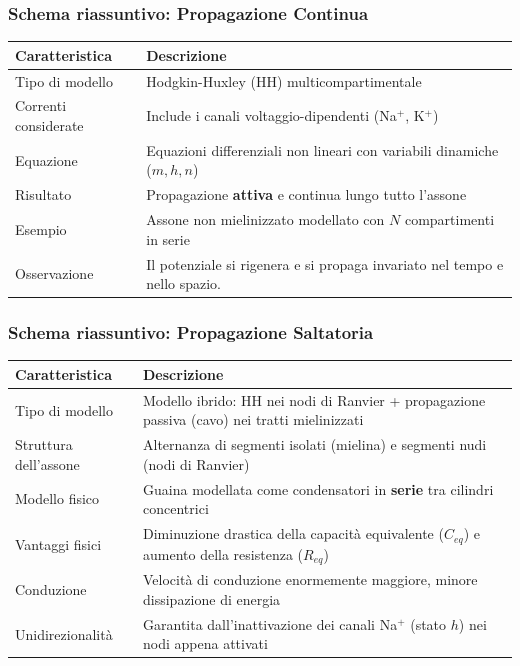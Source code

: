 \documentclass[12pt,a4paper,openany]{book}
\begin{document}
\subsubsection{Schema riassuntivo: Propagazione Continua}
\begin{table}[H]
\centering
\renewcommand{\arraystretch}{1.5}
\begin{tabularx}{\textwidth}{l X}
\toprule
\textbf{Caratteristica} & \textbf{Descrizione} \\
\midrule
Tipo di modello & Hodgkin-Huxley (HH) multicompartimentale \\
Correnti considerate & Include i canali voltaggio-dipendenti (Na$^+$, K$^+$) \\
Equazione & Equazioni differenziali non lineari con variabili dinamiche ($m, h, n$) \\
Risultato & Propagazione \textbf{attiva} e continua lungo tutto l’assone \\
Esempio & Assone non mielinizzato modellato con $N$ compartimenti in serie \\
Osservazione & Il potenziale si rigenera e si propaga invariato nel tempo e nello spazio. \\
\bottomrule
\end{tabularx}
\end{table}

\subsubsection{Schema riassuntivo: Propagazione Saltatoria}
\begin{table}[H]
\centering
\renewcommand{\arraystretch}{1.5}
\begin{tabularx}{\textwidth}{l X}
\toprule
\textbf{Caratteristica} & \textbf{Descrizione} \\
\midrule
Tipo di modello & Modello ibrido: HH nei nodi di Ranvier + propagazione passiva (cavo) nei tratti mielinizzati \\
Struttura dell’assone & Alternanza di segmenti isolati (mielina) e segmenti nudi (nodi di Ranvier) \\
Modello fisico & Guaina modellata come condensatori in \textbf{serie} tra cilindri concentrici \\
Vantaggi fisici & Diminuzione drastica della capacità equivalente ($C_{eq}$) e aumento della resistenza ($R_{eq}$) \\
Conduzione & Velocità di conduzione enormemente maggiore, minore dissipazione di energia \\
Unidirezionalità & Garantita dall’inattivazione dei canali Na$^+$ (stato $h$) nei nodi appena attivati \\
\bottomrule
\end{tabularx}
\end{table}
\end{document}
